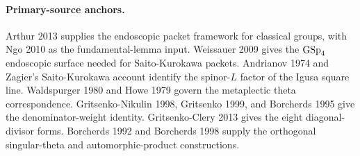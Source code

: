 \paragraph{Primary-source anchors.}
Arthur 2013 supplies the endoscopic packet framework for classical
groups, with Ngo 2010 as the fundamental-lemma input. Weissauer 2009
gives the $\mathrm{GSp}_4$ endoscopic surface needed for Saito-Kurokawa packets.
Andrianov 1974 and Zagier's Saito-Kurokawa account identify the
spinor-$L$ factor of the Igusa square line. Waldspurger 1980 and Howe
1979 govern the metaplectic theta correspondence. Gritsenko-Nikulin
1998, Gritsenko 1999, and Borcherds 1995 give the denominator-weight
identity. Gritsenko-Clery 2013 gives the eight diagonal-divisor forms.
Borcherds 1992 and Borcherds 1998 supply the orthogonal singular-theta
and automorphic-product constructions.

